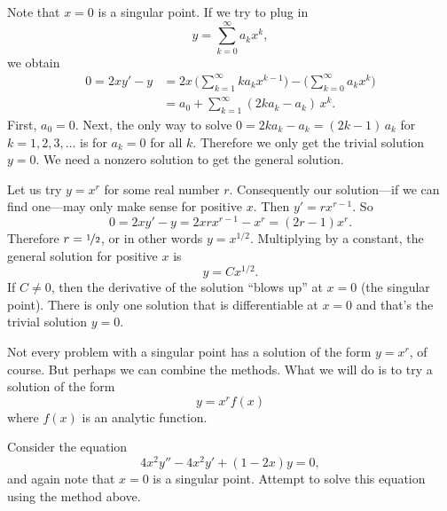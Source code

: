 \documentclass{ximera}
\begin{document}
\begin{exampleSol}
    Note that $x=0$ is a singular point. If we try to plug in
    \begin{equation*}
        y = \sum_{k=0}^\infty a_k x^k ,
    \end{equation*}
    we obtain
    \begin{equation*}
        \begin{split}
            0 = 2 xy'-y 
            &=  2x \, \Biggl( \sum_{k=1}^\infty k a_k x^{k-1}  \Biggr) - \Biggl( \sum_{k=0}^\infty a_k x^k \Biggr) \\
            & = a_0 + \sum_{k=1}^\infty (2 k a_k - a_k) \, x^{k} .
        \end{split}
    \end{equation*}
    First, $a_0 = 0$.  Next, the only way to solve $0 = 2 k a_k - a_k = (2k-1) \, a_k$ for $k = 1,2,3,\dots$ is for $a_k = 0$ for all $k$. Therefore we only get the trivial solution $y=0$.  We need a nonzero solution to get the general solution.
    
    Let us try $y=x^r$ for some real number $r$. Consequently our solution---if we can find one---may only make sense for positive $x$. Then $y' = r x^{r-1}$.  So
    \begin{equation*}
        0 = 2 x y' - y = 2 x r x^{r-1} - x^r = (2r-1) x^r .
    \end{equation*}
    Therefore $r= \nicefrac{1}{2}$, or in other words $y = x^{1/2}$. Multiplying by a constant, the general solution for positive $x$ is
    \begin{equation*}
        y = C x^{1/2} .
    \end{equation*}
    If $C \not= 0$, then the derivative of the solution ``blows up'' at $x=0$ (the singular point).  There is only one solution that is differentiable at $x=0$ and that's the trivial solution $y=0$.
\end{exampleSol}

Not every problem with a singular point has a solution of the form $y=x^r$, of course.  But perhaps we can combine the methods.  What we will do is to try a solution of the form
\begin{equation*}
    y = x^r f(x)
\end{equation*}
where $f(x)$ is an analytic function.

\begin{example}
    Consider the equation
    \begin{equation*}
        4 x^2 y'' - 4 x^2 y' + (1-2x)y = 0,
    \end{equation*}
    and again note that $x=0$ is a singular point. Attempt to solve this equation using the method above.
\end{example}
\end{document}
